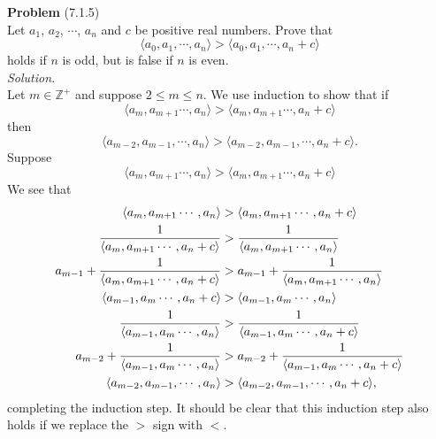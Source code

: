 \documentclass[12 pt]{amsart}
\begin{document}
\phantom{\quad} \vfill
\noindent
\textbf{Problem} (7.1.5) \\[4ex]
  Let $a_1$, $a_2$, $\cdots$, $a_n$ and $c$
  be positive real numbers.
  Prove that 
  \[
    \langle a_0, a_1, \cdots, a_n \rangle 
    > 
    \langle a_0, a_1, \cdots, a_n + c \rangle 
  \]
  holds if $n$ is odd, but is false if $n$ is even.
  \\[2ex]
\emph{Solution.} \\[2ex]
  Let $m \in \mathbb{Z}^+$ and suppose
  $2 \leq m \leq n$.
  We use induction to show that if
  \[
    \langle a_m, a_{m+1} \cdots, a_n \rangle 
    > 
    \langle a_m, a_{m+1} \cdots, a_n + c\rangle 
  \]
  then
  \[
    \langle a_{m-2}, a_{m-1}, \cdots, a_n \rangle 
    > 
    \langle a_{m-2}, a_{m-1}, \cdots, a_n + c\rangle.
  \]
  Suppose 
  \[
    \langle a_m, a_{m+1} \cdots, a_n \rangle 
    > 
    \langle a_m, a_{m+1} \cdots, a_n + c\rangle 
  \]
  We see that 
  \begin{align}
    \notag
    \langle a_m, a_{m+1} \cdots, a_n \rangle 
    &> 
      \langle a_m, a_{m+1} \cdots, a_n + c\rangle  \\
    \notag
    \frac{1}{\langle a_m, a_{m+1} \cdots, a_n + c\rangle}
    &> 
      \frac{1}{\langle a_m, a_{m+1} \cdots, a_n\rangle}  \\
    \notag
    a_{m-1} + \frac{1}{\langle a_m, a_{m+1} \cdots, a_n + c\rangle}
    &> 
      a_{m-1} + \frac{1}{\langle a_m, a_{m+1} \cdots, a_n\rangle}  \\
    \label{eq:7.1.5.1}
    \langle a_{m-1}, a_{m} \cdots, a_n + c\rangle 
    &> 
      \langle a_{m-1}, a_{m} \cdots, a_n \rangle  \\
    \notag
    \frac{1}{\langle a_{m-1}, a_{m} \cdots, a_n\rangle} 
    &> 
      \frac{1}{\langle a_{m-1}, a_{m} \cdots, a_n + c\rangle}  \\
    \notag
    a_{m-2} + \frac{1}{\langle a_{m-1}, a_{m} \cdots, a_n\rangle} 
    &> 
      a_{m-2} + \frac{1}{\langle a_{m-1}, a_{m} \cdots, a_n + c\rangle}  \\
    \label{eq:7.1.5.2}
    \langle a_{m-2}, a_{m-1}, \cdots, a_n \rangle 
    &> 
      \langle a_{m-2}, a_{m-1}, \cdots, a_n + c\rangle,
  \end{align}
  completing the induction step.
  It should be clear that this induction step also holds if 
  we replace the $>$ sign with $<$.
\end{document}
